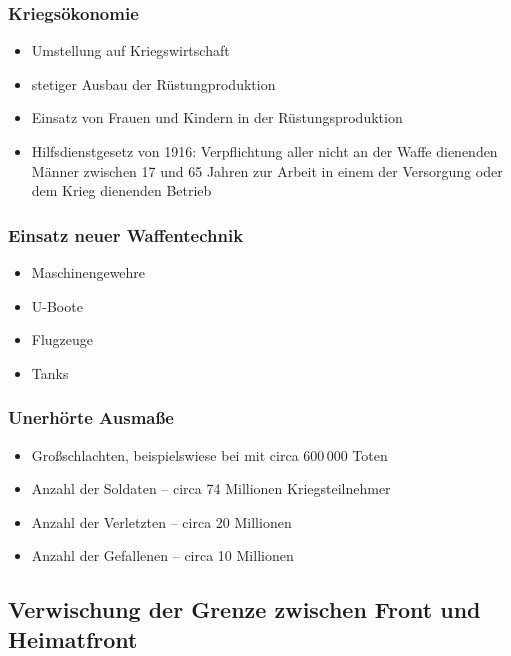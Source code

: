 \subsubsection{Kriegsökonomie}

\begin{itemize}
\item Umstellung auf Kriegswirtschaft
\item stetiger Ausbau der Rüstungproduktion
\item Einsatz von Frauen und Kindern in der Rüstungsproduktion
\item Hilfsdienstgesetz von 1916: Verpflichtung aller nicht an der
Waffe dienenden Männer zwischen 17 und 65 Jahren zur Arbeit in einem
der Versorgung oder dem Krieg dienenden Betrieb 
\end{itemize}


\subsubsection{Einsatz neuer Waffentechnik}

\begin{itemize}
\item Maschinengewehre
\item U-Boote
\item Flugzeuge
\item Tanks
\end{itemize}


\subsubsection{Unerhörte Ausmaße}

\begin{itemize}
\item Großschlachten, beispielswiese bei  mit circa 600\,000
Toten
\item Anzahl der Soldaten -- circa 74 Millionen Kriegsteilnehmer
\item Anzahl der Verletzten -- circa 20 Millionen
\item Anzahl der Gefallenen -- circa 10 Millionen
\end{itemize}


\subsection*{Verwischung der Grenze zwischen Front und Heimatfront}

